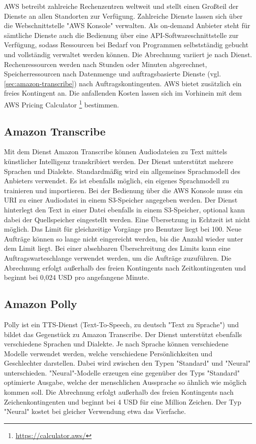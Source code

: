 AWS betreibt zahlreiche Rechenzentren weltweit und stellt einen Großteil der Dienste an allen Standorten zur Verfügung. Zahlreiche Dienste lassen sich über die Webschnittstelle "AWS Konsole" verwalten. Als on-demand Anbieter steht für sämtliche Dienste auch die Bedienung über eine API-Softwareschnittstelle zur Verfügung, sodass Ressourcen bei Bedarf von Programmen selbstständig gebucht und vollständig verwaltet werden können. Die Abrechnung variiert je nach Dienst. Rechenressourcen werden nach Stunden oder Minuten abgerechnet, Speicherressourcen nach Datenmenge und auftragsbasierte Dienste (vgl. \autoref{sec:amazon-transcribe}) nach Auftragskontingenten. AWS bietet zusätzlich ein freies Kontingent an. Die anfallenden Kosten lassen sich im Vorhinein mit dem AWS Pricing Calculator \footnote{\url{https://calculator.aws/}} bestimmen. 

\subsection{Amazon Transcribe}
\label{sec:amazon-transcribe}

Mit dem Dienst Amazon Transcribe können Audiodateien zu Text mittels künstlicher Intelligenz transkribiert werden. Der Dienst unterstützt mehrere Sprachen und Dialekte. Standardmäßig wird ein allgemeines Sprachmodell des Anbieters verwendet. Es ist ebenfalls möglich, ein eigenes Sprachmodell zu trainieren und importieren. Bei der Bedienung über die AWS Konsole muss ein URI zu einer Audiodatei in einem S3-Speicher angegeben werden. Der Dienst hinterlegt den Text in einer Datei ebenfalls in einem S3-Speicher, optional kann dabei der Quellspeicher eingestellt werden. Eine Übersetzung in Echtzeit ist nicht möglich. Das Limit für gleichzeitige Vorgänge pro Benutzer liegt bei 100. Neue Aufträge können so lange nicht eingereicht werden, bis die Anzahl wieder unter dem Limit liegt. Bei einer absehbaren Überschreitung des Limits kann eine Auftragswarteschlange verwendet werden, um die Aufträge zuzuführen. Die Abrechnung erfolgt außerhalb des freien Kontingents nach Zeitkontingenten und beginnt bei 0,024 USD pro angefangene Minute.

\subsection{Amazon Polly}
Polly ist ein TTS-Dienst (Text-To-Speech, zu deutsch "Text zu Sprache") und bildet das Gegenstück zu Amazon Transcribe. Der Dienst unterstützt ebenfalls verschiedene Sprachen und Dialekte. Je nach Sprache können verschiedene Modelle verwendet werden, welche verschiedene Persönlichkeiten und Geschlechter darstellen. Dabei wird zwischen den Typen "Standard" und "Neural" unterschieden. "Neural"-Modelle erzeugen eine gegenüber des Typs "Standard" optimierte Ausgabe, welche der menschlichen Aussprache so ähnlich wie möglich kommen soll. Die Abrechnung erfolgt außerhalb des freien Kontingents nach Zeichenkontingenten und beginnt bei 4 USD für eine Million Zeichen. Der Typ "Neural" kostet bei gleicher Verwendung etwa das Vierfache. 
